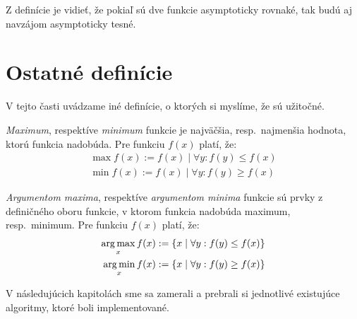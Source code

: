Z definície je vidieť, že pokiaľ sú dve funkcie asymptoticky rovnaké, tak budú 
aj navzájom asymptoticky tesné.

\section{Ostatné definície}

V tejto časti uvádzame iné definície, o ktorých si myslíme, že sú užitočné.

\emph{Maximum}, respektíve \emph{minimum} funkcie je najväčšia, resp.\ najmenšia 
hodnota, ktorú funkcia nadobúda. Pre funkciu $f(x)$ platí, že: 
\begin{align*}
\max f(x) := f(x) \mid \forall y : f(y) \leq f(x) \\
\min f(x) := f(x) \mid \forall y : f(y) \geq f(x)
\end{align*}

\emph{Argumentom maxima}, respektíve \emph{argumentom minima} funkcie sú prvky 
z definičného oboru funkcie, v ktorom funkcia nadobúda maximum, resp.\ minimum. 
Pre funkciu $f(x)$ platí, že: 
\begin{align*}
\operatorname*{arg\,max}_x f(x) := \left\{x \mid \forall y : f(y) \leq f(x)\right\} \\
\operatorname*{arg\,min}_x f(x) := \left\{x \mid \forall y : f(y) \geq f(x)\right\}
\end{align*}

V následujúcich kapitolách sme sa zamerali a prebrali si jednotlivé existujúce 
algoritmy, ktoré boli implementované.
